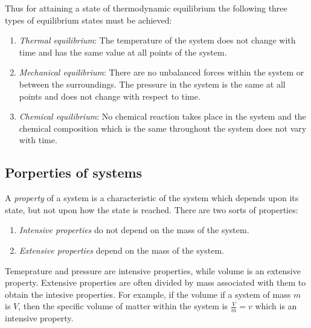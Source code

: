 Thus for attaining a state of thermodynamic equilibrium the following three types of equilibrium states must be achieved:

\begin{definition}
	\begin{enumerate}
		\item \emph{Thermal equilibrium}: The temperature of the system does not change with time and has the same value at all points of the system.
		\item \emph{Mechanical equilibrium}: There are no unbalanced forces within the system or between the surroundings.
		The pressure in the system is the same at all points and does not change with respect to time.
		\item \emph{Chemical equilibrium}: No chemical reaction takes place in the system and the chemical composition which is the same throughout the system does not vary with time.
	\end{enumerate}
\end{definition}

\subsection{Porperties of systems}

\begin{definition}[Property]
	A \emph{property} of a system is a characteristic of the system which depends upon its state, but not upon how the state is reached.
	There are two sorts of properties:
	\begin{enumerate}
		\item \emph{Intensive properties} do not depend on the mass of the system.
		\item \emph{Extensive properties} depend on the mass of the system.
	\end{enumerate}
\end{definition}

\begin{example}
	Temeprature and pressure are intensive properties, while volume is an extensive property.
	Extensive properties are often divided by mass associated with them to obtain the intesive properties.
	For example, if the volume if a system of mass \(m\) is \(V\), then the specific volume of matter within the system is \(\frac{V}{m} = v\) which is an intensive property.
\end{example}


